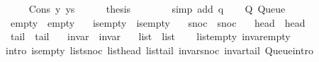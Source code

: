 \begin{isabellebody}
\ \ \ \ \isamarkupfalse%
\ {\isacharparenleft}{\kern0pt}Cons\ y\ ys{\isacharparenright}{\kern0pt}\isanewline
\ \ \ \ \isamarkupfalse%
\ {\isacharquery}{\kern0pt}thesis\isanewline
\ \ \ \ \ \ \isamarkupfalse%
\ {\isacharparenleft}{\kern0pt}simp\ add{\isacharcolon}{\kern0pt}\ q{\isacharparenright}{\kern0pt}\isanewline
\ \ \isamarkupfalse%
\isanewline
{}\isamarkupfalse%
%
\endisatagproof
{\isafoldproof}%
%
\isadelimproof
\isanewline
%
\endisadelimproof
\isanewline
{}\isamarkupfalse%
\ Q{\isacharcolon}{\kern0pt}\ Queue\ \isanewline
\ \ empty\ {\isacharequal}{\kern0pt}\ empty\ \isanewline
\ \ is{\isacharunderscore}{\kern0pt}empty\ {\isacharequal}{\kern0pt}\ is{\isacharunderscore}{\kern0pt}empty\ \isanewline
\ \ snoc\ {\isacharequal}{\kern0pt}\ snoc\ \isanewline
\ \ head\ {\isacharequal}{\kern0pt}\ head\ \isanewline
\ \ tail\ {\isacharequal}{\kern0pt}\ tail\ \isanewline
\ \ invar\ {\isacharequal}{\kern0pt}\ invar\ \isanewline
\ \ list\ {\isacharequal}{\kern0pt}\ list\isanewline
%
\isadelimproof
\ \ %
\endisadelimproof
%
\isatagproof
{}\isamarkupfalse%
\ list{\isacharunderscore}{\kern0pt}empty\ invar{\isacharunderscore}{\kern0pt}empty\isanewline
\ \ \isamarkupfalse%
\ {\isacharparenleft}{\kern0pt}intro\ is{\isacharunderscore}{\kern0pt}empty\ list{\isacharunderscore}{\kern0pt}snoc\ list{\isacharunderscore}{\kern0pt}head\ list{\isacharunderscore}{\kern0pt}tail\ invar{\isacharunderscore}{\kern0pt}snoc\ invar{\isacharunderscore}{\kern0pt}tail\ Queue{\isachardot}{\kern0pt}intro{\isacharparenright}{\kern0pt}%
\endisatagproof
{\isafoldproof}%
%
\isadelimproof
\isanewline
%
\endisadelimproof
%
\isadelimtheory
\isanewline
%
\endisadelimtheory
%
\isatagtheory
{}\isamarkupfalse%
%
\endisatagtheory
{\isafoldtheory}%
%
\isadelimtheory
%
\endisadelimtheory
%
\end{isabellebody}%
\endinput
